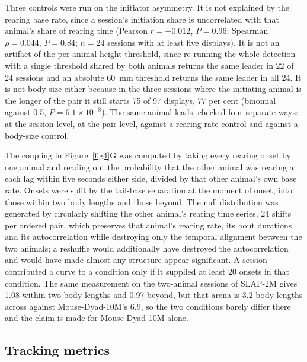 \documentclass[pdflatex, sn-nature]{sn-jnl}
\theoremstyle{thmstyleone}%
\theoremstyle{thmstyletwo}%
\theoremstyle{thmstylethree}%
\begin{document}
Three controls were run on the initiator asymmetry. It is not explained by the rearing base rate, since a session's initiation share is uncorrelated with that animal's share of rearing time (Pearson $r = -0.012$, $P = 0.96$; Spearman $\rho = 0.044$, $P = 0.84$; $n = 24$ sessions with at least five displays). It is not an artifact of the per-animal height threshold, since re-running the whole detection with a single threshold shared by both animals returns the same leader in 22 of 24 sessions and an absolute 60~mm threshold returns the same leader in all 24. It is not body size either because in the three sessions where the initiating animal is the longer of the pair it still starts 75 of 97 displays, 77 per cent (binomial against 0.5, $P = 6.1 \times 10^{-8}$). The same animal leads, checked four separate ways: at the session level, at the pair level, against a rearing-rate control and against a body-size control.

The coupling in Figure~\ref{fig4}G was computed by taking every rearing onset by one animal and reading out the probability that the other animal was rearing at each lag within five seconds either side, divided by that other animal's own base rate. Onsets were split by the tail-base separation at the moment of onset, into those within two body lengths and those beyond. The null distribution was generated by circularly shifting the other animal's rearing time series, 24 shifts per ordered pair, which preserves that animal's rearing rate, its bout durations and its autocorrelation while destroying only the temporal alignment between the two animals; a reshuffle would additionally have destroyed the autocorrelation and would have made almost any structure appear significant. A session contributed a curve to a condition only if it supplied at least 20 onsets in that condition. The same measurement on the two-animal sessions of SLAP-2M gives 1.08 within two body lengths and 0.97 beyond, but that arena is 3.2 body lengths across against Mouse-Dyad-10M's 6.9, so the two conditions barely differ there and the claim is made for Mouse-Dyad-10M alone.

\subsection{Tracking metrics}\label{methods-tracking}
\end{document}
